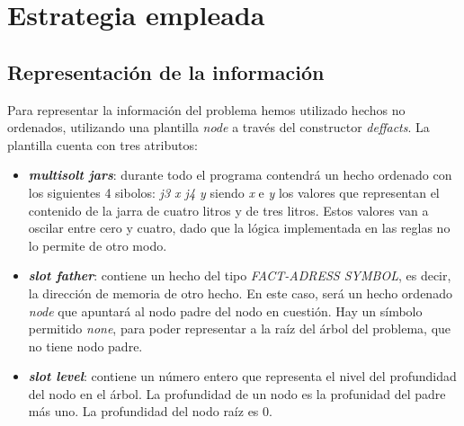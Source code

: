 \documentclass[11pt,a4paper,final]{article}
\begin{document}
\newpage

\section{Estrategia empleada}
\subsection{Representación de la información}
Para representar la información del problema hemos utilizado hechos no ordenados, utilizando una plantilla \emph{node} a través del constructor \emph{deffacts}. La plantilla cuenta con tres atributos: 

\begin{itemize}
	\item \textbf{\emph{multisolt jars}}: durante todo el programa contendrá un hecho ordenado con los siguientes 4 sibolos: \emph{j3 x j4 y} siendo \emph{x} e \emph{y} los valores que representan el contenido de la jarra de cuatro litros y de tres litros. Estos valores van a oscilar entre cero y cuatro, dado que la lógica implementada en las reglas no lo permite de otro modo.
	\item \textbf{\emph{slot father}}: contiene un hecho del tipo \emph{FACT-ADRESS SYMBOL}, es decir, la dirección de memoria de otro hecho. En este caso, será un hecho ordenado \emph{node} que apuntará al nodo padre del nodo en cuestión. Hay un símbolo permitido \emph{none}, para poder representar a la raíz del árbol del problema, que no tiene nodo padre.
	\item \textbf{\emph{slot level}}: contiene un número entero que representa el nivel del profundidad del nodo en el árbol. La profundidad de un nodo es la profunidad del padre más uno. La profundidad del nodo raíz es 0.
\end{itemize}
\end{document}
